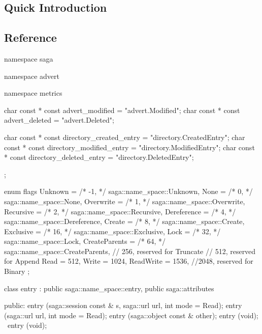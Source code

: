 
 \subsection{Quick Introduction}

 \subsection{Reference}

  \begin{mycode}[label=Prototypes: saga::advert]
  namespace saga
  {
    namespace advert 
    {
      namespace metrics 
      {
        char const * const advert_modified          
                   =      "advert.Modified";
        char const * const advert_deleted           
                   =      "advert.Deleted";
  
        char const * const directory_created_entry  
                   =      "directory.CreatedEntry";
        char const * const directory_modified_entry 
                   =      "directory.ModifiedEntry";
        char const * const directory_deleted_entry  
                   =      "directory.DeletedEntry";
      };
      
      enum flags 
      {
        Unknown         = /*  -1, */  saga::name_space::Unknown, 
        None            = /*   0, */  saga::name_space::None, 
        Overwrite       = /*   1, */  saga::name_space::Overwrite, 
        Recursive       = /*   2, */  saga::name_space::Recursive, 
        Dereference     = /*   4, */  saga::name_space::Dereference, 
        Create          = /*   8, */  saga::name_space::Create, 
        Exclusive       = /*  16, */  saga::name_space::Exclusive, 
        Lock            = /*  32, */  saga::name_space::Lock, 
        CreateParents   = /*  64, */  saga::name_space::CreateParents, 
                          // 256,          reserved for Truncate
                          // 512,          reserved for Append 
        Read            =    512, 
        Write           =   1024, 
        ReadWrite       =   1536,
                          //2048,          reserved for Binary
      }; 
  
      class entry 
          : public saga::name_space::entry,
            public saga::attributes
      {
        public:
          entry (saga::session const & s, 
                 saga::url             url,
                 int                   mode = Read);
          entry (saga::url             url,
                 int                   mode = Read);
          entry (saga::object const &  other);
          entry (void);
         ~entry (void);
  
}}}
\end{mycode}
